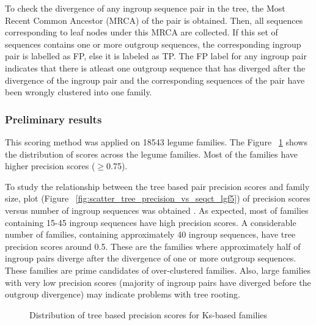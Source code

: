 \documentclass{article}
\begin{document}
		To check the divergence of any ingroup sequence pair in the tree, the Most Recent Common Ancestor (MRCA) of the pair is obtained. Then, all sequences corresponding to leaf nodes under this MRCA are collected. If this set of sequences contains one or more outgroup sequences, the corresponding ingroup pair is labelled as FP, else it is labeled as TP. The FP label for any ingroup pair indicates that there is atleast one outgroup sequence that has diverged after the divergence of the ingroup pair and the corresponding sequences of the pair have been wrongly clustered into one family. 
		
		\subsubsection{Preliminary results}
		This scoring method was applied on 18543 legume families. The Figure ~\ref{fig:hist_tree_precision_scores_lgf5} shows the distribution of scores across the legume families. Most of the families have higher precision scores ($\geq$0.75).
		
		To study the relationship between the tree based pair precision scores and family size, plot (Figure ~\ref{fig:scatter_tree_precision_vs_seqct_lgf5}) of precision scores versus number of ingroup sequences was obtained . As expected, most of families containing 15-45 ingroup sequences  have high precision scores. A considerable number of families, containing approximately 40 ingroup sequences, have tree precision scores around 0.5. These are the families where approximately half of ingroup pairs diverge after the divergence of one or more outgroup sequences. These families are prime candidates of over-clustered families. Also, large families with very low precision scores (majority of ingroup pairs have diverged before the outgroup divergence) may indicate problems with tree rooting.
		
		
		\begin{figure}[h!]
			\caption{Distribution of tree based precision scores for Ks-based families}
			\label{fig:hist_tree_precision_scores_lgf5}
		\end{figure}
		
\end{document}
